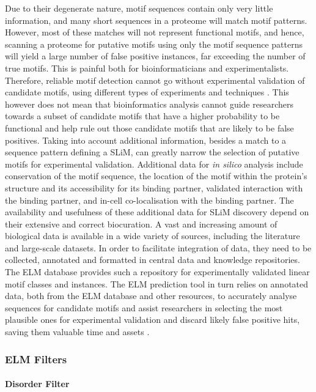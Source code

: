 \documentclass[12pt]{article}
\begin{document}
Due to their degenerate nature, motif sequences contain only very little
information, and many short sequences in a proteome will match motif patterns.
However, most of these matches will not represent functional motifs, and hence,
scanning a proteome for putative motifs using only the motif sequence
patterns will yield a large number of false positive instances, far exceeding
the number of true motifs.
This is painful both for bioinformaticians and experimentalists.
Therefore, reliable motif detection cannot go without
experimental validation of candidate motifs, using different types of
experiments and techniques \citep{26581338}. This however does not mean that
bioinformatics analysis cannot guide researchers towards a subset of candidate
motifs that have a higher probability to be functional and help rule out those
candidate motifs that are likely to be false positives. Taking into account
additional information, besides a match to a sequence pattern defining a SLiM,
can greatly narrow the selection of putative motifs for experimental validation.
Additional data for \textit{in silico} analysis include conservation of the motif
sequence, the location of the motif within the protein's structure and its
accessibility for its binding partner, validated interaction with the binding
partner, and in-cell co-localisation with the binding partner. The availability
and usefulness of these additional data for SLiM discovery depend on their
extensive and correct biocuration. A vast and increasing amount of biological
data is available in a wide variety of sources, including the literature and
large-scale datasets. In order to facilitate integration of data, they need to
be collected, annotated and formatted in central data and knowledge
repositories. The ELM database provides such a repository for experimentally
validated linear motif classes and instances. The ELM prediction tool in turn
relies on annotated data, both from the ELM database and other resources, to
accurately analyse sequences for candidate motifs and assist researchers
in selecting the most plausible ones for experimental validation and discard
likely false positive hits, saving them valuable time and assets
\citep{22110040}.

\subsubsection*{ELM Filters}

\paragraph*{Disorder Filter}\label{DisorderFilter}
\end{document}
